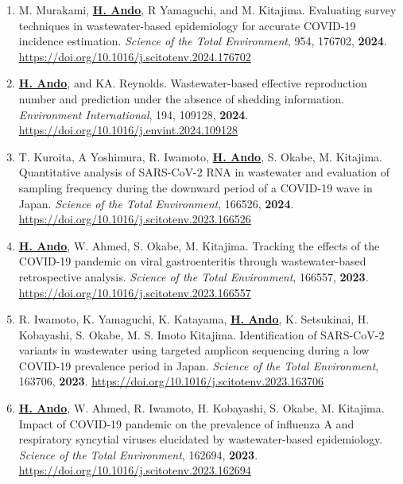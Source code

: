 \documentclass[11pt,a4paper]{article}
\begin{document}
\begin{enumerate}[label=\arabic*., series=pubcount, leftmargin=1.5em, nosep]
    \item M. Murakami, \textbf{\underline{H. Ando}}, R Yamaguchi, and M. Kitajima. Evaluating survey techniques in wastewater-based epidemiology for accurate COVID-19 incidence estimation. \textit{Science of the Total Environment}, 954, 176702, \textbf{2024}. \url{https://doi.org/10.1016/j.scitotenv.2024.176702}
    \addtocounter{enumi}{-2}

    \item \textbf{\underline{H. Ando}}, and KA. Reynolds. Wastewater-based effective reproduction number and prediction under the absence of shedding information. \textit{Environment International}, 194, 109128, \textbf{2024}. \url{https://doi.org/10.1016/j.envint.2024.109128}
    \addtocounter{enumi}{-2}

    \item T. Kuroita, A Yoshimura, R. Iwamoto, \textbf{\underline{H. Ando}}, S. Okabe, M. Kitajima. Quantitative analysis of SARS-CoV-2 RNA in wastewater and evaluation of sampling frequency during the downward period of a COVID-19 wave in Japan. \textit{Science of the Total Environment}, 166526, \textbf{2024}. \url{https://doi.org/10.1016/j.scitotenv.2023.166526}
    \addtocounter{enumi}{-2}

    \item \textbf{\underline{H. Ando}}, W. Ahmed, S. Okabe, M. Kitajima. Tracking the effects of the COVID-19 pandemic on viral gastroenteritis through wastewater-based retrospective analysis. \textit{Science of the Total Environment}, 166557, \textbf{2023}. \url{https://doi.org/10.1016/j.scitotenv.2023.166557}
    \addtocounter{enumi}{-2}

    \item R. Iwamoto, K. Yamaguchi, K. Katayama, \textbf{\underline{H. Ando}}, K. Setsukinai, H. Kobayashi, S. Okabe, M. S. Imoto Kitajima. Identification of SARS-CoV-2 variants in wastewater using targeted amplicon sequencing during a low COVID-19 prevalence period in Japan. \textit{Science of the Total Environment}, 163706, \textbf{2023}. \url{https://doi.org/10.1016/j.scitotenv.2023.163706}
    \addtocounter{enumi}{-2}

    \item \textbf{\underline{H. Ando}}, W. Ahmed, R. Iwamoto, H. Kobayashi, S. Okabe, M. Kitajima. Impact of COVID-19 pandemic on the prevalence of influenza A and respiratory syncytial viruses elucidated by wastewater-based epidemiology. \textit{Science of the Total Environment}, 162694, \textbf{2023}. \url{https://doi.org/10.1016/j.scitotenv.2023.162694}
    \addtocounter{enumi}{-2}


\end{enumerate}
\end{document}
